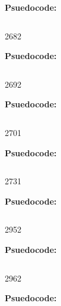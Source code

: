
\textbf{Psuedocode:}
\begin{verbatim}
\end{verbatim}


        {268}{2}

\textbf{Psuedocode:}
\begin{verbatim}
\end{verbatim}


        {269}{2}

\textbf{Psuedocode:}
\begin{verbatim}
\end{verbatim}


      {270}{1}

\textbf{Psuedocode:}
\begin{verbatim}
\end{verbatim}


       {273}{1}

\textbf{Psuedocode:}
\begin{verbatim}
\end{verbatim}


        {295}{2}

\textbf{Psuedocode:}
\begin{verbatim}
\end{verbatim}


  {296}{2}

\textbf{Psuedocode:}
\begin{verbatim}
\end{verbatim}

